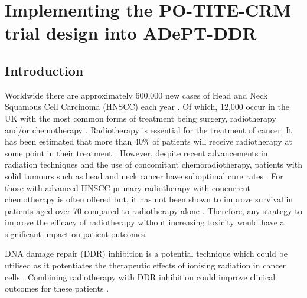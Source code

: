 
\chapter{Implementing the PO-TITE-CRM trial design into ADePT-DDR} %

\label{Adept} %


\section{Introduction}
\label{adept:Introduction}

Worldwide there are approximately 600,000 new cases of Head and Neck Squamous Cell Carcinoma (HNSCC) each year \cite{stranskyMutationalLandscapeHead2011}. Of which, 12,000 occur in the UK with the most common forms of treatment being surgery, radiotherapy and/or chemotherapy \cite{cancerreaserchukHeadNeckCancers2017}. Radiotherapy is essential for the treatment of cancer. It has been estimated that more than 40\% of patients will receive radiotherapy at some point in their treatment \cite{roundRadiotherapyDemandActivity2013}. However, despite recent advancements in radiation techniques and the use of concomitant chemoradiotherapy, patients with solid tumours such as head and neck cancer have suboptimal cure rates \cite{cancerreaserchukHeadNeckCancers2017,cognettiHeadNeckCancer2008}. For those with advanced HNSCC primary radiotherapy with concurrent chemotherapy is often offered but, it has not been shown to improve survival in patients aged over 70 compared to radiotherapy alone \cite{pignonChemotherapyAddedLocoregional2000}. Therefore, any strategy to improve the efficacy of radiotherapy without increasing toxicity would have a significant impact on patient outcomes. 

DNA damage repair (DDR) inhibition is a potential technique which could be utilised as it potentiates the therapeutic effects of ionising radiation in cancer cells \cite{oconnorTargetingDNADamage2015}. Combining radiotherapy with DDR inhibition could improve clinical outcomes for these patients \cite{chalmersScienceFocusCombining2016}.  

